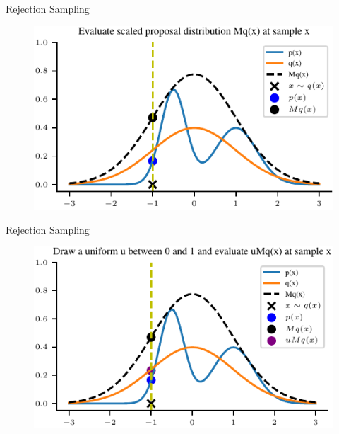 \documentclass[handout]{beamer}
\begin{document}
    \begin{frame}{Rejection Sampling}
        \begin{figure}
            \centering
            \includegraphics{notebooks/figures/sampling/rejection-sampling--1.0-True-True-True-True-True-True-False-False.pdf}
        \end{figure}
    \end{frame}

    \begin{frame}{Rejection Sampling}
        \begin{figure}
            \centering
            \includegraphics{notebooks/figures/sampling/rejection-sampling--1.0-True-True-True-True-True-True-True-False.pdf}
        \end{figure}
    \end{frame}
\end{document}
